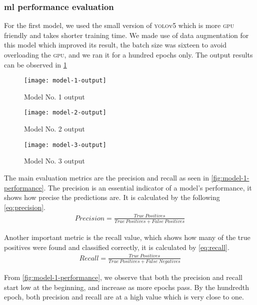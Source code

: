 \documentclass[../main.tex]{subfiles}
\begin{document}
\subsubsection{\gls{ml} performance evaluation}

For the first model, we used the small version of \textsc{yolo}v5 which is 
more \textsc{gpu} friendly and takes shorter training time.
We made use of data augmentation for this model which improved its result,
the batch size was sixteen to avoid overloading the \textsc{gpu}, 
and we ran it for a hundred epochs only. The output results can be observed in 
\cref{fig:model-1-output}

\begin{figure}[tbp] 
	\centering
	\texttt{[image: model-1-output]} 
	\caption{Model No. 1 output} \label{fig:model-1-output} 
\end{figure}

\begin{figure}[tbp] 
	\centering
	\texttt{[image: model-2-output]} 
	\caption{Model No. 2 output} \label{fig:model-2-output} 
\end{figure}

\begin{figure}[tbp] 
	\centering
	\texttt{[image: model-3-output]} 
	\caption{Model No. 3 output} \label{fig:model-3-output} 
\end{figure}

The main evaluation metrics are the precision and recall
as seen in \cref{fig:model-1-performance}.
The precision is an essential indicator of a model's performance, it shows 
how precise the predictions are. 
It is calculated by the following \cref{eq:precision}. 
%
\begin{align}
    Precision =  \frac{True\ Positives}{True\ Positives + False\ Positives} \label{eq:precision}
\end{align}

Another important metric is the recall value, which shows how many of the 
true positives were found and classified correctly, it is calculated by \cref{eq:recall}.
%
\begin{align}
    Recall =  \frac{True\ Positives}{True\ Positives + False\ Negatives} \label{eq:recall}
\end{align}

From \cref{fig:model-1-performance}, we observe that both the precision and recall start low 
at the beginning, and increase as more epochs pass. By the hundredth 
epoch, both precision and recall are at a high value which is very close 
to one.  
\end{document}

